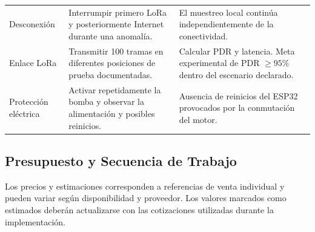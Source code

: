 \documentclass[11pt,a4paper]{article}
\begin{document}
{\begin{longtable}{p{3cm}p{7.7cm}p{4.5cm}}
Desconexión &
Interrumpir primero LoRa y posteriormente Internet durante una anomalía. &
El muestreo local continúa independientemente de la conectividad. \\

Enlace LoRa &
Transmitir 100 tramas en diferentes posiciones de prueba documentadas. &
Calcular PDR y latencia. Meta experimental de PDR $\geq95\%$ dentro del escenario declarado. \\

Protección eléctrica &
Activar repetidamente la bomba y observar la alimentación y posibles reinicios. &
Ausencia de reinicios del ESP32 provocados por la conmutación del motor. \\

\bottomrule
\end{longtable}
}

\subsection{Presupuesto y Secuencia de Trabajo}

Los precios y estimaciones corresponden a referencias de venta individual y pueden variar según disponibilidad y proveedor. Los valores marcados como estimados deberán actualizarse con las cotizaciones utilizadas durante la implementación.
\end{document}
